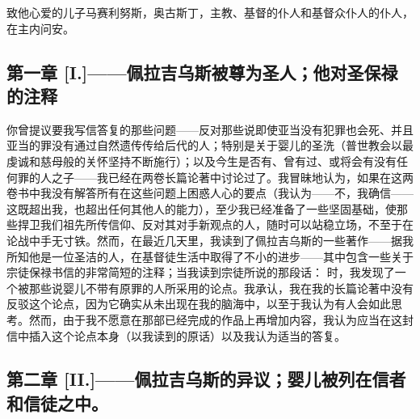 \par

致他心爱的儿子马赛利努斯，奥古斯丁，主教、基督的仆人和基督众仆人的仆人，在主内问安。\par


\subsection{第一章 [I.]——佩拉吉乌斯被尊为圣人；他对圣保禄的注释}

你曾提议要我写信答复的那些问题——反对那些说即使亚当没有犯罪也会死、并且亚当的罪没有通过自然遗传传给后代的人；特别是关于婴儿的圣洗（普世教会以最虔诚和慈母般的关怀坚持不断施行）；以及今生是否有、曾有过、或将会有没有任何罪的人之子——我已经在两卷长篇论著中讨论过了。我冒昧地认为，如果在这两卷书中我没有解答所有在这些问题上困惑人心的要点（我认为——不，我确信——这既超出我，也超出任何其他人的能力），至少我已经准备了一些坚固基础，使那些捍卫我们祖先所传信仰、反对其对手新观点的人，随时可以站稳立场，不至于在论战中手无寸铁。然而，在最近几天里，我读到了佩拉吉乌斯的一些著作——据我所知他是一位圣洁的人，在基督徒生活中取得了不小的进步——其中包含一些关于宗徒保禄书信的非常简短的注释；当我读到宗徒所说的那段话：  时，我发现了一个被那些说婴儿不带有原罪的人所采用的论点。我承认，我在我的长篇论著中没有反驳这个论点，因为它确实从未出现在我的脑海中，以至于我认为有人会如此思考。然而，由于我不愿意在那部已经完成的作品上再增加内容，我认为应当在这封信中插入这个论点本身（以我读到的原话）以及我认为适当的答复。\par


\subsection{第二章 [II.]——佩拉吉乌斯的异议；婴儿被列在信者和信徒之中。}

